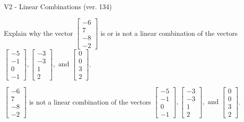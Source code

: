 \begin{exercise}
  \begin{exerciseTitle}V2 - Linear Combinations (ver. 134)\end{exerciseTitle}
  \begin{exerciseStatement}
    Explain why the vector \(\left[\begin{array}{c}
-6 \\
7 \\
-8 \\
-2
\end{array}\right]\)  is or is not a linear 
	combination of the vectors \(\left[\begin{array}{c}
-5 \\
-1 \\
0 \\
-1
\end{array}\right] , \left[\begin{array}{c}
-3 \\
-3 \\
1 \\
2
\end{array}\right] , \text{ and } \left[\begin{array}{c}
0 \\
0 \\
3 \\
2
\end{array}\right]\).
	


  \end{exerciseStatement}
  \begin{exerciseAnswer}
   \(\left[\begin{array}{c}
-6 \\
7 \\
-8 \\
-2
\end{array}\right]\) 
  	 is not  
	a linear combination of the vectors \(\left[\begin{array}{c}
-5 \\
-1 \\
0 \\
-1
\end{array}\right] , \left[\begin{array}{c}
-3 \\
-3 \\
1 \\
2
\end{array}\right] , \text{ and } \left[\begin{array}{c}
0 \\
0 \\
3 \\
2
\end{array}\right]\).

	
  


  \end{exerciseAnswer}
\end{exercise}